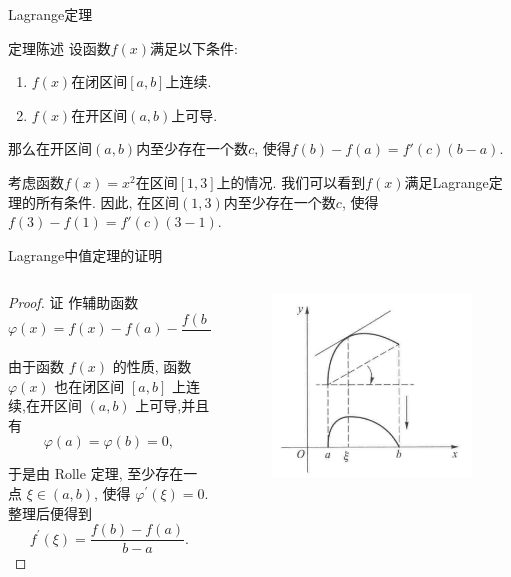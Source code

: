 \documentclass[
10pt,
aspectratio=43,
]{beamer}
\begin{document}
\begin{frame}{Lagrange定理}
	\begin{block}{定理陈述}
		设函数$f(x)$满足以下条件:
		\begin{enumerate}
			\item $f(x)$在闭区间$[a, b]$上连续.
			\item $f(x)$在开区间$(a, b)$上可导.
		\end{enumerate}
		那么在开区间$(a, b)$内至少存在一个数$c$, 使得$f(b) - f(a) = f'(c)(b - a)$.
	\end{block}

	\pause

	\begin{example}
		考虑函数$f(x) = x^2$在区间$[1, 3]$上的情况. 我们可以看到$f(x)$满足Lagrange定理的所有条件. 因此, 在区间$(1, 3)$内至少存在一个数$c$, 使得$f(3) - f(1) = f'(c)(3 - 1)$.
	\end{example}
\end{frame}

\begin{frame}[t]{Lagrange中值定理的证明} \begin{columns}[onlytextwidth] \begin{column}{0.6\textwidth} \begin{proof} 证 作辅助函数
				$$ \varphi(x)=f(x)-f(a)-\frac{f(b)-f(a)}{b-a}(x-a), $$

				由于函数 $f(x)$ 的性质, 函数 $\varphi(x)$ 也在闭区间 $[a, b]$ 上连续,在开区间 $(a, b)$ 上可导,并且有
				$$
					\varphi(a)=\varphi(b)=0,
				$$

				于是由 Rolle 定理, 至少存在一点 $\xi \in(a, b)$, 使得 $\varphi^{\prime}(\xi)=0$. 整理后便得到
				$$
					f^{\prime}(\xi)=\frac{f(b)-f(a)}{b-a} .
				$$
			\end{proof}
		\end{column}
		\begin{column}{0.4\textwidth}
			\begin{figure}
				\includegraphics[width=0.88\linewidth]{phi-function.png}
			\end{figure}
		\end{column}
	\end{columns}
\end{frame}
\end{document}
